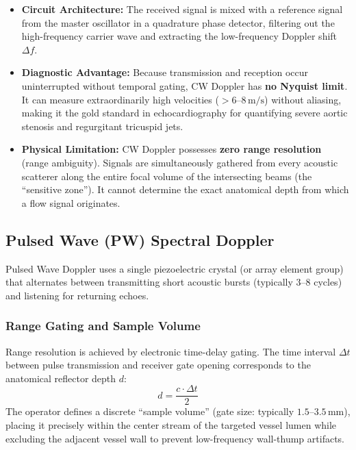 \documentclass[11pt,a4paper]{article}
\begin{document}
\begin{itemize}[leftmargin=*]
    \item \textbf{Circuit Architecture:} The received signal is mixed with a reference signal from the master oscillator in a quadrature phase detector, filtering out the high-frequency carrier wave and extracting the low-frequency Doppler shift $\Delta f$.
    \item \textbf{Diagnostic Advantage:} Because transmission and reception occur uninterrupted without temporal gating, CW Doppler has \textbf{no Nyquist limit}. It can measure extraordinarily high velocities ($> 6\text{--}8\,\text{m/s}$) without aliasing, making it the gold standard in echocardiography for quantifying severe aortic stenosis and regurgitant tricuspid jets.
    \item \textbf{Physical Limitation:} CW Doppler possesses \textbf{zero range resolution} (range ambiguity). Signals are simultaneously gathered from every acoustic scatterer along the entire focal volume of the intersecting beams (the ``sensitive zone''). It cannot determine the exact anatomical depth from which a flow signal originates.
\end{itemize}

\subsection{Pulsed Wave (PW) Spectral Doppler}

Pulsed Wave Doppler uses a single piezoelectric crystal (or array element group) that alternates between transmitting short acoustic bursts (typically $3\text{--}8$ cycles) and listening for returning echoes.

\subsubsection{Range Gating and Sample Volume}
Range resolution is achieved by electronic time-delay gating. The time interval $\Delta t$ between pulse transmission and receiver gate opening corresponds to the anatomical reflector depth $d$:
\begin{equation}
    d = \frac{c \cdot \Delta t}{2}
\end{equation}
The operator defines a discrete ``sample volume'' (gate size: typically $1.5\text{--}3.5\,\text{mm}$), placing it precisely within the center stream of the targeted vessel lumen while excluding the adjacent vessel wall to prevent low-frequency wall-thump artifacts.
\end{document}

